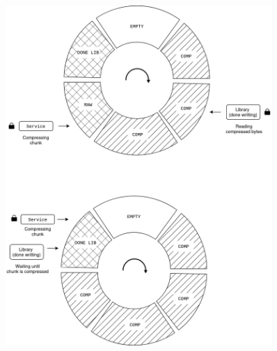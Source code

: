\documentclass[12pt]{article}
\begin{document}
\begin{figure}[h]
\centering
\includegraphics[width=0.9\textwidth]{AOS-done.png}
\end{figure}
\FloatBarrier
\end{document}

